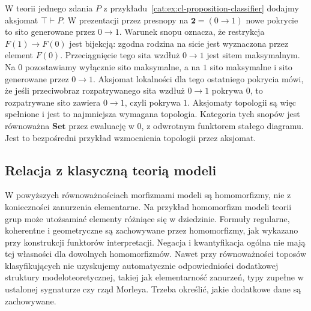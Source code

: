 \begin{przyklad}\label{cat:ex:cl-quotient-proposition}
W teorii jednego zdania $P$ z przykładu~\ref{cat:ex:cl-proposition-classifier} dodajmy aksjomat $\top\vdash P$. W prezentacji przez presnopy na $\mathbf 2=(0\to1)$ nowe pokrycie to sito generowane przez $0\to1$. Warunek snopu oznacza, że restrykcja $F(1)\to F(0)$ jest bijekcją: zgodna rodzina na sicie jest wyznaczona przez element $F(0)$. Przeciągnięcie tego sita wzdłuż $0\to1$ jest sitem maksymalnym. Na $0$ pozostawiamy wyłącznie sito maksymalne, a na $1$ sito maksymalne i sito generowane przez $0\to1$. Aksjomat lokalności dla tego ostatniego pokrycia mówi, że jeśli przeciwobraz rozpatrywanego sita wzdłuż $0\to1$ pokrywa $0$, to rozpatrywane sito zawiera $0\to1$, czyli pokrywa $1$. Aksjomaty topologii są więc spełnione i jest to najmniejsza wymagana topologia. Kategoria tych snopów jest równoważna $\mathbf{Set}$ przez ewaluację w $0$, z odwrotnym funktorem stałego diagramu. Jest to bezpośredni przykład wzmocnienia topologii przez aksjomat.
\end{przyklad}

\subsection{Relacja z klasyczną teorią modeli}

W powyższych równoważnościach morfizmami modeli są homomorfizmy, nie z konieczności zanurzenia elementarne. Na przykład homomorfizm modeli teorii grup może utożsamiać elementy różniące się w dziedzinie. Formuły regularne, koherentne i geometryczne są zachowywane przez homomorfizmy, jak wykazano przy konstrukcji funktorów interpretacji. Negacja i kwantyfikacja ogólna nie mają tej własności dla dowolnych homomorfizmów. Nawet przy równoważności toposów klasyfikujących nie uzyskujemy automatycznie odpowiedniości dodatkowej struktury modeloteoretycznej, takiej jak elementarność zanurzeń, typy zupełne w ustalonej sygnaturze czy rząd Morleya. Trzeba określić, jakie dodatkowe dane są zachowywane.

